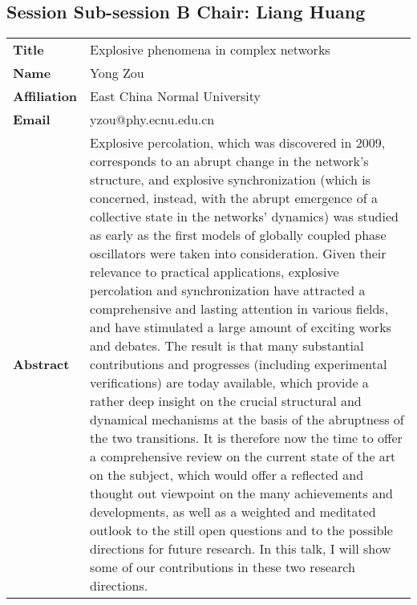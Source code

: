 \documentclass[oneside,A4paper,12pt]{article}
\begin{document}
\subsection*{Session \uppercase\expandafter{} \hspace{10mm} Sub-session B \hspace{10mm} Chair: Liang Huang}
\label{sec:orgba88674}
\begin{longtable}{p{2cm}p{14cm}}
\toprule
\textbf{Title} & Explosive phenomena in complex networks\\
\textbf{Name} & Yong Zou\\
\textbf{Affiliation} & East China Normal University\\
\textbf{Email} & yzou@phy.ecnu.edu.cn\\
\textbf{Abstract} & Explosive percolation, which was discovered in 2009, corresponds to an abrupt change in the network’s structure, and explosive synchronization (which is concerned, instead, with the abrupt emergence of a collective state in the networks’ dynamics) was studied as early as the first models of globally coupled phase oscillators were taken into consideration. Given their relevance to practical applications, explosive percolation and synchronization have attracted a comprehensive and lasting attention in various fields, and have stimulated a large amount of exciting works and debates. The result is that many substantial contributions and progresses (including experimental verifications) are today available, which provide a rather deep insight on the crucial structural and dynamical mechanisms at the basis of the abruptness of the two transitions. It is therefore now the time to offer a comprehensive review on the current state of the art on the subject, which would offer a reflected and thought out viewpoint on the many achievements and developments, as well as a weighted and meditated outlook to the still open questions and to the possible directions for future research. In this talk, I will show some of our contributions in these two research directions.\\
\bottomrule
\end{longtable}
\end{document}

